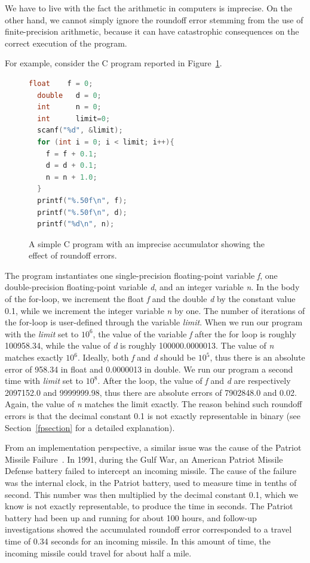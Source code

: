 %
We have to live with the fact the arithmetic in computers is imprecise.
%
On the other hand, we cannot simply ignore the roundoff error stemming from the use of finite-precision arithmetic, because it can have catastrophic consequences on the correct execution of the program.
%

For example, consider the C program reported in Figure~\ref{fig:while}.
%
\begin{figure}[b!]
	\begin{lstlisting}[frame=single, language=c]
  float    f = 0;
  double   d = 0;
  int      n = 0;
  int      limit=0;
  scanf("%d", &limit);
  for (int i = 0; i < limit; i++){
    f = f + 0.1;
    d = d + 0.1;
    n = n + 1.0;
  }
  printf("%.50f\n", f);
  printf("%.50f\n", d);
  printf("%d\n", n);
	\end{lstlisting}
	\caption{A simple C program with an imprecise accumulator showing the effect of roundoff errors.}\label{fig:while}
\end{figure}
%
The program instantiates one single-precision floating-point variable \emph{f}, one double-precision floating-point variable \emph{d}, and an integer variable \emph{n}.
%
In the body of the for-loop, we increment the float \emph{f} and the double \emph{d} by the constant value 0.1, while we increment the integer variable \emph{n} by one.
%
The number of iterations of the for-loop is user-defined through the variable \emph{limit}.
%
When we run our program with the \emph{limit} set to $10^6$, the value of the variable \emph{f} after the for loop is roughly 100958.34, while the value of \emph{d} is roughly 100000.0000013. The value of \emph{n} matches exactly $10^6$.
%
Ideally, both \emph{f} and \emph{d} should be $10^5$, thus there is an absolute error of 958.34 in float and 0.0000013 in double.
%
We run our program a second time with \emph{limit} set to $10^8$. 
%
After the loop, the value of \emph{f} and \emph{d} are respectively 2097152.0 and 9999999.98, thus there are absolute errors of 7902848.0 and 0.02. 
%
Again, the value of \emph{n} matches the limit exactly.
%
The reason behind such roundoff errors is that the decimal constant 0.1 is not exactly representable in binary (see Section~\ref{fpsection} for a detailed explanation). 

%
From an implementation perspective, a similar issue was the cause of the Patriot Missile Failure~\cite{patriot}.
%
In 1991, during the Gulf War, an American Patriot Missile Defense battery failed to intercept an incoming missile.
%
The cause of the failure was the internal clock, in the Patriot battery, used to measure time in tenths of second.
%
This number was then multiplied by the decimal constant 0.1, which we know is not exactly representable, to produce the time in seconds.
%
The Patriot battery had been up and running for about 100 hours, and follow-up investigations showed the accumulated roundoff error corresponded to a travel time of 0.34 seconds for an incoming missile. 
%
In this amount of time, the incoming missile could travel for about half a mile.
%

